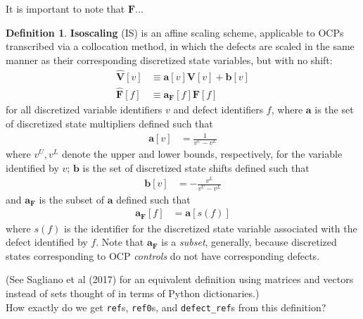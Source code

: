 \documentclass{article}
\theoremstyle{definition}
\newtheorem{definition}{Definition}
\begin{document}
\noindent
It is important to note that $\textbf{F}$... \\

\hline
\noindent
\begin{definition}
\textbf{Isoscaling} (IS) is an affine scaling scheme, applicable to OCPs transcribed via a collocation method, in which the defects are scaled in the same manner as their corresponding discretized state variables, but with no shift:
\begin{align*}
    \hat{\textbf{V}}[v] &\equiv \textbf{a}[v] \textbf{V}[v] + \textbf{b}[v] \\
    \hat{\textbf{F}}[f] &\equiv \textbf{a}_\textbf{F}[f] \textbf{F}[f]
\end{align*}
for all discretized variable identifiers $v$ and defect identifiers $f$, where $\textbf{a}$ is the set of discretized state multipliers defined such that
\begin{align*}
    \textbf{a}[v] &= \frac{1}{v^U - v^L}
\end{align*}
where $v^U,v^L$ denote the upper and lower bounds, respectively, for the variable identified by $v$; $\textbf{b}$ is the set of discretized state shifts defined such that
\begin{align*}
    \textbf{b}[v] &= -\frac{v^L}{v^U - v^L}
\end{align*}
and $\textbf{a}_\textbf{F}$ is the subset of $\textbf{a}$ defined such that
\begin{align*}
    \textbf{a}_\textbf{F}[f] &= \textbf{a}[s(f)]
\end{align*}
where $s(f)$ is the identifier for the discretized state variable associated with the defect identified by $f$. Note that $\textbf{a}_\textbf{F}$ is a \textit{subset}, generally, because discretized states corresponding to OCP \textit{controls} do not have corresponding defects.
\end{definition}

\hline
\noindent
(See Sagliano et al (2017) for an equivalent definition using matrices and vectors instead of sets thought of in terms of Python dictionaries.) \\

\noindent
How exactly do we get \texttt{ref}s, \texttt{ref0}s, and \texttt{defect\_ref}s from this definition? \\
\end{document}

